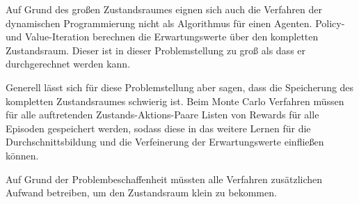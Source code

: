 \documentclass[10pt]{scrartcl}
\begin{document}
Auf Grund des großen Zustandsraumes eignen sich auch die Verfahren der dynamischen Programmierung nicht als Algorithmus für einen Agenten. Policy- und Value-Iteration berechnen die Erwartungswerte über den kompletten Zustandsraum. Dieser ist in dieser Problemstellung zu groß als dass er durchgerechnet werden kann.

Generell lässt sich für diese Problemstellung aber sagen, dass die Speicherung des kompletten Zustandsraumes schwierig ist. Beim Monte Carlo Verfahren müssen für alle auftretenden Zustands-Aktions-Paare Listen von Rewards für alle Episoden gespeichert werden, sodass diese in das weitere Lernen für die Durchschnittsbildung und die Verfeinerung der Erwartungswerte einfließen können. 

Auf Grund der Problembeschaffenheit müssten alle Verfahren zusätzlichen Aufwand betreiben, um den Zustandsraum klein zu bekommen.
\end{document}
